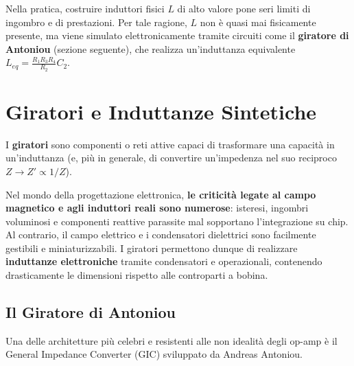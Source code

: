 \noindent Nella pratica, costruire induttori fisici $L$ di alto valore pone seri limiti di ingombro e di prestazioni. Per tale ragione, $L$ non è quasi mai fisicamente presente, ma viene simulato elettronicamente tramite circuiti come il \textbf{giratore di Antoniou} (sezione seguente), che realizza un'induttanza equivalente $L_{eq} = \frac{R_1 R_3 R_4}{R_2} C_2$.


\section{Giratori e Induttanze Sintetiche}

I \textbf{giratori} sono componenti o reti attive capaci di trasformare una capacità in un'induttanza (e, più in generale, di convertire un'impedenza nel suo reciproco $Z \to Z' \propto 1/Z$). 

Nel mondo della progettazione elettronica, \textbf{le criticità legate al campo magnetico e agli induttori reali sono numerose}: isteresi, ingombri voluminosi e componenti reattive parassite mal sopportano l'integrazione su chip. Al contrario, il campo elettrico e i condensatori dielettrici sono facilmente gestibili e miniaturizzabili. I giratori permettono dunque di realizzare \textbf{induttanze elettroniche} tramite condensatori e operazionali, contenendo drasticamente le dimensioni rispetto alle controparti a bobina.

\subsection{Il Giratore di Antoniou}
Una delle architetture più celebri e resistenti alle non idealità degli op-amp è il General Impedance Converter (GIC) sviluppato da Andreas Antoniou. 

